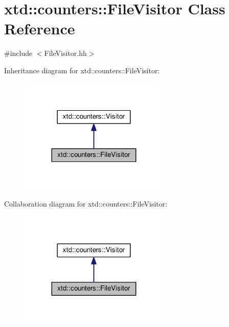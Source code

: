 \hypertarget{classxtd_1_1counters_1_1FileVisitor}{}\section{xtd\+:\+:counters\+:\+:File\+Visitor Class Reference}
\label{classxtd_1_1counters_1_1FileVisitor}


{\ttfamily \#include $<$File\+Visitor.\+hh$>$}



Inheritance diagram for xtd\+:\+:counters\+:\+:File\+Visitor\+:
\nopagebreak
\begin{figure}[H]
\begin{center}
\leavevmode
\includegraphics[width=203pt]{classxtd_1_1counters_1_1FileVisitor__inherit__graph}
\end{center}
\end{figure}


Collaboration diagram for xtd\+:\+:counters\+:\+:File\+Visitor\+:
\nopagebreak
\begin{figure}[H]
\begin{center}
\leavevmode
\includegraphics[width=203pt]{classxtd_1_1counters_1_1FileVisitor__coll__graph}
\end{center}
\end{figure}
